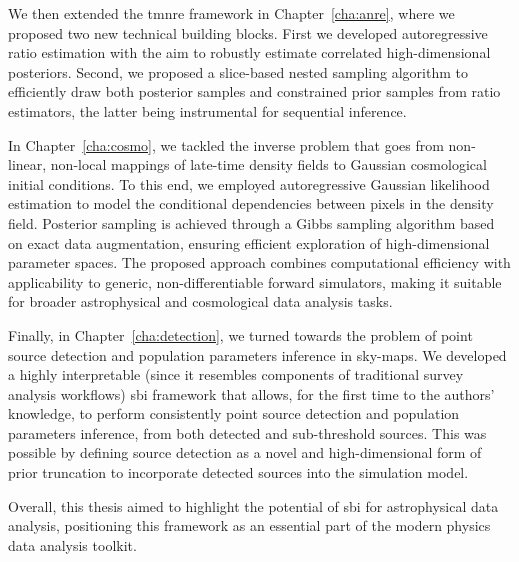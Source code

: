 We then extended the \gls*{tmnre} framework in Chapter~\ref{cha:anre}, where we proposed two new technical building blocks. First we developed autoregressive ratio estimation with the aim to robustly estimate correlated high-dimensional posteriors. Second, we proposed a slice-based nested sampling algorithm to efficiently draw both posterior samples and constrained prior samples from ratio estimators, the latter being instrumental for sequential inference.  

In Chapter~\ref{cha:cosmo}, we tackled the inverse problem that goes from non-linear, non-local mappings of late-time density fields to Gaussian cosmological initial conditions. To this end, we employed autoregressive Gaussian likelihood estimation to model the conditional dependencies between pixels in the density field. Posterior sampling is achieved through a Gibbs sampling algorithm based on exact data augmentation, ensuring efficient exploration of high-dimensional parameter spaces. The proposed approach combines computational efficiency with applicability to generic, non-differentiable forward simulators, making it suitable for broader astrophysical and cosmological data analysis tasks.

Finally, in Chapter~\ref{cha:detection}, we turned towards the problem of point source detection and population parameters inference in sky-maps. We developed a highly interpretable (since it resembles components of traditional survey analysis workflows) \gls*{sbi} framework that allows, for the first time to the authors' knowledge, to perform consistently point source detection and population parameters inference, from both detected and sub-threshold sources. This was possible by defining source detection as a novel and high-dimensional form of prior truncation to incorporate detected sources into the simulation model.

Overall, this thesis aimed to highlight the potential of \gls*{sbi} for astrophysical data analysis, positioning this framework as an essential part of the modern physics data analysis toolkit.
